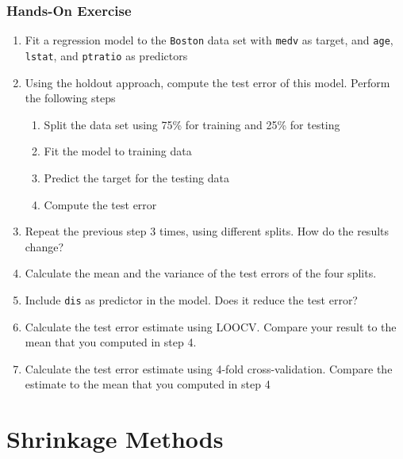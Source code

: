 \begin{tcolorbox}[colback=code]
\subsubsection*{Hands-On Exercise} 

\begin{enumerate}
  \item Fit a regression model to the \texttt{Boston} data set with \texttt{medv} as target, and \texttt{age}, \texttt{lstat}, and \texttt{ptratio} as predictors
  \item Using the holdout approach, compute the test error of this model. Perform the following steps
  \begin{enumerate}
     \item Split the data set using 75\% for training and 25\% for testing
     \item Fit the model to training data
     \item Predict the target for the testing data
     \item Compute the test error
  \end{enumerate}
  \item Repeat the previous step 3 times, using different splits. How do the results change?
  \item Calculate the mean and the variance of the test errors of the four splits. 
  \item Include \texttt{dis} as predictor in the model. Does it reduce the test error?
  \item Calculate the test error estimate using LOOCV. Compare your result to the mean that you computed in step 4.
  \item Calculate the test error estimate using 4-fold cross-validation. Compare the estimate to the mean that you computed in step 4
\end{enumerate}
\end{tcolorbox}

\section{Shrinkage Methods}

